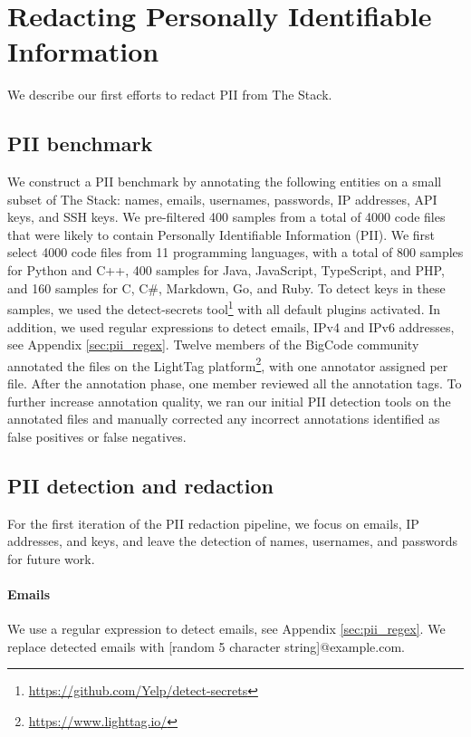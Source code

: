 \documentclass[10pt]{article} \usepackage{iclr2023_conference,times}
\begin{document}
\section{Redacting Personally Identifiable Information }\label{sec:PII}
We describe our first efforts to redact PII from The Stack. 

\subsection{PII benchmark}
We construct a PII benchmark by
annotating the following entities on a small subset of The Stack: names, emails, usernames, passwords, IP addresses, API keys, and SSH keys. We pre-filtered 400 samples from a total of 4000 code files that were likely to contain Personally Identifiable Information (PII). We first select 4000 code files from 11 programming languages, with a total of 800 samples for Python and C++, 400 samples for Java, JavaScript, TypeScript, and PHP, and 160 samples for C, C\#, Markdown, Go, and Ruby. To detect keys in these samples, we used the detect-secrets tool\footnote{\url{https://github.com/Yelp/detect-secrets}} with all default plugins activated. In addition, we used regular expressions to detect emails, IPv4 and IPv6 addresses, see Appendix \ref{sec:pii_regex}. Twelve members of the BigCode community annotated the files on the LightTag platform\footnote{\url{https://www.lighttag.io/}}, with one annotator assigned per file. After the annotation phase, one member reviewed all the annotation tags. To further increase annotation quality, we ran our initial PII detection tools on the annotated files and manually corrected any incorrect annotations identified as false positives or false negatives.



\subsection{PII detection and redaction}
For the first iteration of the PII redaction pipeline, we focus on emails, IP addresses, and keys, and leave the detection of names, usernames, and passwords for future work.  

\paragraph{Emails} We use a regular expression to detect emails, see Appendix \ref{sec:pii_regex}. We replace detected emails with [random 5 character string]@example.com. 
\end{document}
